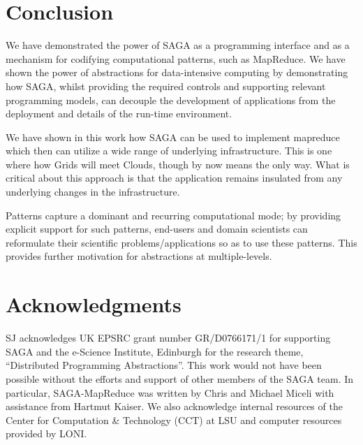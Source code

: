 \documentclass[conference,final]{IEEEtran}
\newcommand{\sagamapreduce }{SAGA-MapReduce }
\begin{document}
\section{Conclusion}

We have demonstrated the power of SAGA as a programming interface and
as a mechanism for codifying computational patterns, such as
MapReduce.  We have shown the power of abstractions for data-intensive
computing by demonstrating how SAGA, whilst providing the required
controls and supporting relevant programming models, can decouple the
development of applications from the deployment and details of the
run-time environment.

We have shown in this work how SAGA can be used to implement mapreduce
which then can utilize a wide range of underlying infrastructure. This
is one where how Grids will meet Clouds, though by now means the only
way. What is critical about this approach is that the application
remains insulated from any underlying changes in the infrastructure.

Patterns capture a dominant and recurring computational mode; by
providing explicit support for such patterns, end-users and domain
scientists can reformulate their scientific problems/applications so
as to use these patterns.  This provides further motivation for
abstractions at multiple-levels. 


\section{Acknowledgments}

SJ acknowledges UK EPSRC grant number GR/D0766171/1 for supporting
SAGA and the e-Science Institute, Edinburgh for the research theme,
``Distributed Programming Abstractions''.  This work would not have
been possible without the efforts and support of other members of the
SAGA team.  In particular, \sagamapreduce was written by Chris and
Michael Miceli with assistance from Hartmut Kaiser.  We also
acknowledge internal resources of the Center for Computation \&
Technology (CCT) at LSU and computer resources provided by LONI.
 
\end{document}
